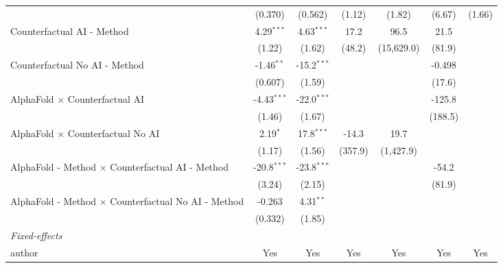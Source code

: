\begin{tabular}{lcccccc}
                                                              & (0.370)       & (0.562)       & (1.12)      & (1.82)     & (6.67)       & (1.66)\\   
   Counterfactual AI - Method                                 & 4.29$^{***}$  & 4.63$^{***}$  & 17.2        & 96.5       & 21.5         &   \\   
                                                              & (1.22)        & (1.62)        & (48.2)      & (15,629.0) & (81.9)       &   \\   
   Counterfactual No AI - Method                              & -1.46$^{**}$  & -15.2$^{***}$ &             &            & -0.498       &   \\   
                                                              & (0.607)       & (1.59)        &             &            & (17.6)       &   \\   
   AlphaFold $\times$ Counterfactual AI                       & -4.43$^{***}$ & -22.0$^{***}$ &             &            & -125.8       &   \\   
                                                              & (1.46)        & (1.67)        &             &            & (188.5)      &   \\   
   AlphaFold $\times$ Counterfactual No AI                    & 2.19$^{*}$    & 17.8$^{***}$  & -14.3       & 19.7       &              &   \\   
                                                              & (1.17)        & (1.56)        & (357.9)     & (1,427.9)  &              &   \\   
   AlphaFold - Method $\times$ Counterfactual AI - Method     & -20.8$^{***}$ & -23.8$^{***}$ &             &            & -54.2        &   \\   
                                                              & (3.24)        & (2.15)        &             &            & (81.9)       &   \\   
   AlphaFold - Method $\times$ Counterfactual No AI - Method  & -0.263        & 4.31$^{**}$   &             &            &              &   \\   
                                                              & (0.332)       & (1.85)        &             &            &              &   \\   
   \midrule
   \emph{Fixed-effects}\\
   author                                                     & Yes           & Yes           & Yes         & Yes        & Yes          & Yes\\  

\end{tabular}
